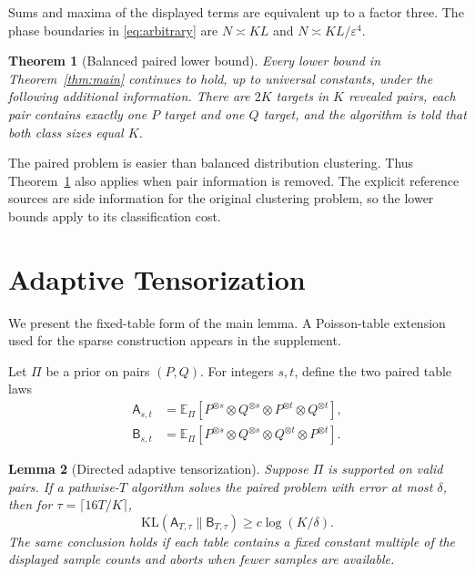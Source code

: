\documentclass[twoside]{article}
\newtheorem{theorem}{Theorem}
\newtheorem{lemma}[theorem]{Lemma}
\newcommand{\E}{\mathbb E}
\newcommand{\KL}{\mathrm{KL}}
\newcommand{\cA}{\mathsf A}
\newcommand{\cB}{\mathsf B}
\begin{document}
Sums and maxima of the displayed terms are equivalent up to a factor three. The phase boundaries in \eqref{eq:arbitrary} are $N\asymp KL$ and $N\asymp KL/\varepsilon^4$.

\begin{theorem}[Balanced paired lower bound]
\label{thm:paired}
Every lower bound in Theorem~\ref{thm:main} continues to hold, up to universal constants, under the following additional information. There are $2K$ targets in $K$ revealed pairs, each pair contains exactly one $P$ target and one $Q$ target, and the algorithm is told that both class sizes equal $K$.
\end{theorem}

The paired problem is easier than balanced distribution clustering. Thus Theorem~\ref{thm:paired} also applies when pair information is removed. The explicit reference sources are side information for the original clustering problem, so the lower bounds apply to its classification cost.

\section{Adaptive Tensorization}

We present the fixed-table form of the main lemma. A Poisson-table extension used for the sparse construction appears in the supplement.

Let $\Pi$ be a prior on pairs $(P,Q)$. For integers $s,t$, define the two paired table laws
\begin{align*}
\cA_{s,t}&=\E_\Pi[P^{\otimes s}\otimes Q^{\otimes s}
\otimes P^{\otimes t}\otimes Q^{\otimes t}],\\
\cB_{s,t}&=\E_\Pi[P^{\otimes s}\otimes Q^{\otimes s}
\otimes Q^{\otimes t}\otimes P^{\otimes t}].
\end{align*}

\begin{lemma}[Directed adaptive tensorization]
\label{lem:tensor}
Suppose $\Pi$ is supported on valid pairs. If a pathwise-$T$ algorithm solves the paired problem with error at most $\delta$, then for $\tau=\lceil16T/K\rceil$,
\begin{equation}
\KL(\cA_{T,\tau}\|\cB_{T,\tau})\geq c\log(K/\delta).
\label{eq:tensor}
\end{equation}
The same conclusion holds if each table contains a fixed constant multiple of the displayed sample counts and aborts when fewer samples are available.
\end{lemma}
\end{document}
